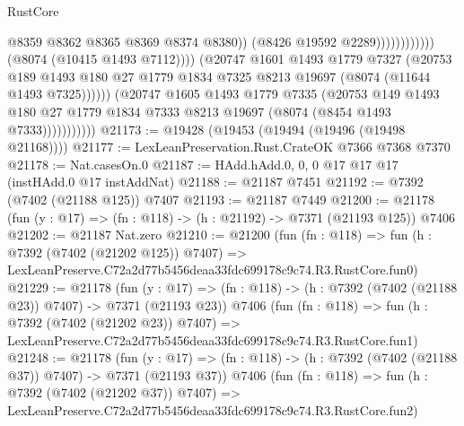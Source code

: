 \begin{lexlean}{RustCore}
\begin{coremodule}
                                                    @8359
                                                    @8362
                                                    @8365
                                                    @8369
                                                    @8374
                                                    @8380))
                                                (@8426 @19592 @2289))))))))))))
                          (@8074 (@10415 @1493 @7112))))
                      (@20747
                        @1601
                        @1493
                        @1779
                        @7327
                        (@20753
                          @189
                          @1493
                          @180
                          @27
                          @1779
                          @1834
                          @7325
                          @8213
                          @19697
                          (@8074 (@11644 @1493 @7325))))))
                  (@20747
                    @1605
                    @1493
                    @1779
                    @7335
                    (@20753
                      @149
                      @1493
                      @180
                      @27
                      @1779
                      @1834
                      @7333
                      @8213
                      @19697
                      (@8074 (@8454 @1493 @7333)))))))))))
@21173 := @19428 (@19453 (@19494 (@19496 (@19498 @21168))))
@21177 := LexLeanPreservation.Rust.CrateOK @7366 @7368 @7370
@21178 := Nat.casesOn.{0}
@21187 := HAdd.hAdd.{0, 0, 0} @17 @17 @17 (instHAdd.{0} @17 instAddNat)
@21188 := @21187 @7451
@21192 := @7392 (@7402 (@21188 @125)) @7407
@21193 := @21187 @7449
@21200 := @21178 (fun (y : @17) => (fn : @118) -> (h : @21192) -> @7371 (@21193 @125)) @7406
@21202 := @21187 Nat.zero
@21210 := @21200
    (fun (fn : @118) =>
    fun (h : @7392 (@7402 (@21202 @125)) @7407) =>
    LexLeanPreserve.C72a2d77b5456deaa33fdc699178c9c74.R3.RustCore.fun0)
@21229 := @21178
    (fun (y : @17) => (fn : @118) -> (h : @7392 (@7402 (@21188 @23)) @7407) -> @7371 (@21193 @23))
    @7406
    (fun (fn : @118) =>
    fun (h : @7392 (@7402 (@21202 @23)) @7407) =>
    LexLeanPreserve.C72a2d77b5456deaa33fdc699178c9c74.R3.RustCore.fun1)
@21248 := @21178
    (fun (y : @17) => (fn : @118) -> (h : @7392 (@7402 (@21188 @37)) @7407) -> @7371 (@21193 @37))
    @7406
    (fun (fn : @118) =>
    fun (h : @7392 (@7402 (@21202 @37)) @7407) =>
    LexLeanPreserve.C72a2d77b5456deaa33fdc699178c9c74.R3.RustCore.fun2)

\end{coremodule}
\end{lexlean}
